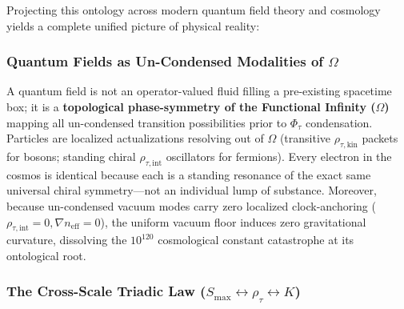 \documentclass[
]{article}
\begin{document}
Projecting this ontology across modern quantum field theory and
cosmology yields a complete unified picture of physical reality:

\subsubsection{\texorpdfstring{Quantum Fields as Un-Condensed Modalities
of
\(\Omega\)}{Quantum Fields as Un-Condensed Modalities of \textbackslash Omega}}\label{quantum-fields-as-un-condensed-modalities-of-omega}

A quantum field is not an operator-valued fluid filling a pre-existing
spacetime box; it is a \textbf{topological phase-symmetry of the
Functional Infinity (\(\Omega\))} mapping all un-condensed transition
possibilities prior to \(\Phi_\tau\) condensation. Particles are
localized actualizations resolving out of \(\Omega\) (transitive
\(\rho_{\tau,\text{kin}}\) packets for bosons; standing chiral
\(\rho_{\tau,\text{int}}\) oscillators for fermions). Every electron in
the cosmos is identical because each is a standing resonance of the
exact same universal chiral symmetry---not an individual lump of
substance. Moreover, because un-condensed vacuum modes carry zero
localized clock-anchoring
(\(\rho_{\tau,\text{int}} = 0, \nabla n_{\text{eff}} = 0\)), the uniform
vacuum floor induces zero gravitational curvature, dissolving the
\(10^{120}\) cosmological constant catastrophe at its ontological root.

\subsubsection{\texorpdfstring{The Cross-Scale Triadic Law
(\(S_{\text{max}} \leftrightarrow \rho_\tau \leftrightarrow K\))}{The Cross-Scale Triadic Law (S\_\{\textbackslash text\{max\}\} \textbackslash leftrightarrow \textbackslash rho\_\textbackslash tau \textbackslash leftrightarrow K)}}\label{the-cross-scale-triadic-law-s_textmax-leftrightarrow-rho_tau-leftrightarrow-k}
\end{document}
